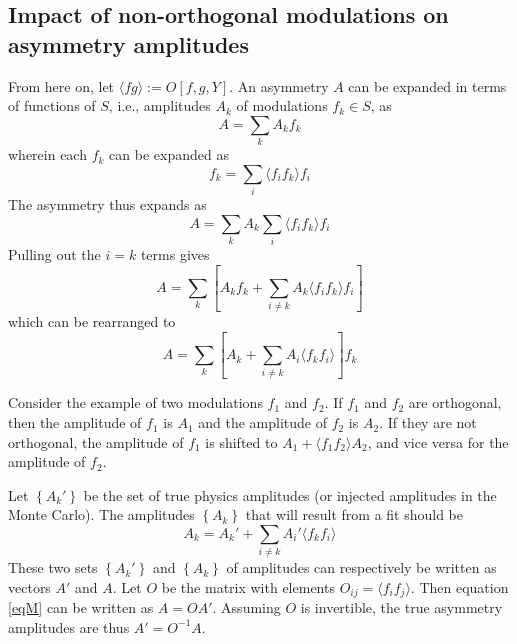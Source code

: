\documentclass[12pt]{article}
\begin{document}
\subsection*{Impact of non-orthogonal modulations on asymmetry amplitudes}
From here on, let $\langle fg\rangle:=O[f,g,Y]$.
An asymmetry $A$ can be expanded in terms of functions of $S$, i.e., amplitudes
$A_k$ of modulations $f_k\in S$, as
\begin{equation}
A=\sum_k{A_kf_k}
\end{equation}
wherein each $f_k$ can be expanded as 
\begin{equation}
f_k=\sum_i{\langle f_if_k\rangle f_i}
\end{equation}
The asymmetry thus expands as
\begin{equation}
A=\sum_k{A_k\sum_i{\langle f_if_k\rangle f_i}}
\end{equation}
Pulling out the $i=k$ terms gives
\begin{equation}
A=\sum_k\left[A_kf_k+\sum_{i\neq k}{A_k\langle f_if_k\rangle f_i}
\right]
\end{equation}
which can be rearranged to
\begin{equation}
A=\sum_k\left[A_k+\sum_{i\neq k}{A_i\langle f_kf_i\rangle}
\right]f_k
\end{equation}

Consider the example of two modulations $f_1$ and $f_2$.
If $f_1$ and $f_2$ are orthogonal, then the amplitude of $f_1$ is $A_1$ and the
amplitude of $f_2$ is $A_2$.  If they are not orthogonal, 
the amplitude of $f_1$ is shifted to $A_1+\langle f_1f_2\rangle A_2$,
and vice versa for the amplitude of $f_2$.

Let $\left\{A_k'\right\}$ be the set of true physics amplitudes (or injected
amplitudes in the Monte Carlo).  The amplitudes $\left\{A_k\right\}$ that will result
from a fit should be 
\begin{equation}
A_k=A_k'+\sum_{i\neq k}{A_i'\langle f_kf_i\rangle}
\label{eqM}
\end{equation}
These two sets $\left\{A_k'\right\}$ and $\left\{A_k\right\}$ of amplitudes can
respectively be written as vectors $A'$ and $A$. Let $O$ be the matrix with
elements $O_{ij}=\langle f_if_j\rangle$. Then equation \ref{eqM} can be written
as $A=OA'$. Assuming $O$ is invertible, the true asymmetry amplitudes are thus
$A'=O^{-1}A$.
\end{document}
